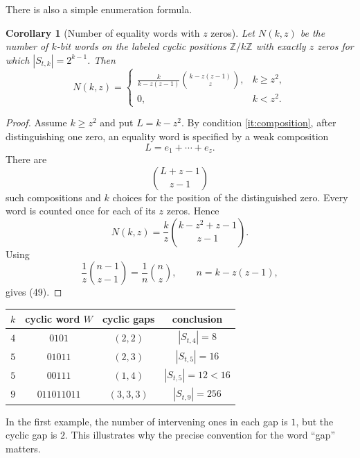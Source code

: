 \documentclass[10pt,a4paper]{article}
\newtheorem{corollary}[theorem]{Corollary}
\begin{document}
There is also a simple enumeration formula.

\begin{corollary}[Number of equality words with $z$ zeros]
Let $N(k,z)$ be the number of $k$-bit words on the labeled cyclic
positions $\mathbb Z/k\mathbb Z$ with exactly $z$ zeros for which $|S_{t,k}|=2^{k-1}$.  Then
\[
N(k,z)=
\begin{cases}
\displaystyle
 \frac{k}{k-z(z-1)}
 \binom{k-z(z-1)}{z},&k\geq z^2,\\[2ex]
0,&k<z^2.
\end{cases}                                                   \tag{49}
\]
\end{corollary}

\begin{proof}
Assume $k\geq z^2$ and put $L=k-z^2$.  By condition
\ref{it:composition}, after distinguishing one zero, an equality word
is specified by a weak composition
\[
                         L=e_1+\cdots+e_z.
\]
There are
\[
                         \binom{L+z-1}{z-1}
\]
such compositions and $k$ choices for the position of the distinguished
zero.  Every word is counted once for each of its $z$ zeros.  Hence
\[
 N(k,z)=\frac{k}{z}\binom{k-z^2+z-1}{z-1}.
\]
Using
\[
 \frac1z\binom{n-1}{z-1}=\frac1n\binom nz,
 \qquad n=k-z(z-1),
\]
gives (49).
\end{proof}

\begin{center}
\begin{tabular}{cccc}
\toprule
$k$ & cyclic word $W$ & cyclic gaps & conclusion\\
\midrule
$4$ & $0101$      & $(2,2)$     & $|S_{t,4}|=8$\\
$5$ & $01011$     & $(2,3)$     & $|S_{t,5}|=16$\\
$5$ & $00111$     & $(1,4)$     & $|S_{t,5}|=12<16$\\
$9$ & $011011011$ & $(3,3,3)$   & $|S_{t,9}|=256$\\
\bottomrule
\end{tabular}
\end{center}

In the first example, the number of intervening ones in each gap is
$1$, but the cyclic gap is $2$.  This illustrates why the
precise convention for the word ``gap'' matters.
\end{document}
